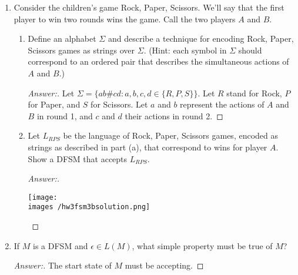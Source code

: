 \documentclass[10pt]{article}
\newcommand{\images}{/home/gparker/classes/341/images}
\begin{document}
\begin{enumerate}
\begin{enumerate}
\addtocounter{enumii}{4}
\item
The set of binary strings with at most one pair of consecutive $0$'s and at most one pair of consecutive $1$'s.
\begin{proof}[Answer:] $ $\\
\begin{flushleft}
\texttt{[image: \\images /hw3fsm2lsolution.png]}
\end{flushleft}
\end{proof}
\end{enumerate}


\item
Consider the children's game Rock, Paper, Scissors.  We'll say that the first player to win two rounds wins the game.  Call the two players $A$ and $B$.
\begin{enumerate}

\item
Define an alphabet $\Sigma$ and describe a technique for encoding Rock, Paper, Scissors games as strings over $\Sigma$. (Hint: each symbol in $\Sigma$ should correspond to an ordered pair that describes the simultaneous actions of $A$ and $B$.)
\begin{proof}[Answer:]
Let $\Sigma = \{ab\#cd : a,b,c,d \in \{R, P, S\}\}$.  Let $R$ stand for Rock, $P$ for Paper, and $S$ for Scissors.  Let $a$ and $b$ represent the actions of $A$ and $B$ in round 1, and $c$ and $d$ their actions in round 2.
\end{proof}

\item
Let $L_{RPS}$ be the language of Rock, Paper, Scissors games, encoded as strings as described in part (a), that correspond to wins for player $A$.  Show a DFSM that accepts $L_{RPS}$.
\begin{proof}[Answer:] $ $\\
\begin{flushleft}
\texttt{[image: \\images /hw3fsm3bsolution.png]}
\end{flushleft}
\end{proof}
\end{enumerate}


\item
If $M$ is a DFSM and $\epsilon \in L(M)$, what simple property must be true of $M$?
\begin{proof}[Answer:]
The start state of $M$ must be accepting.
\end{proof}


\end{enumerate}
\end{document}
